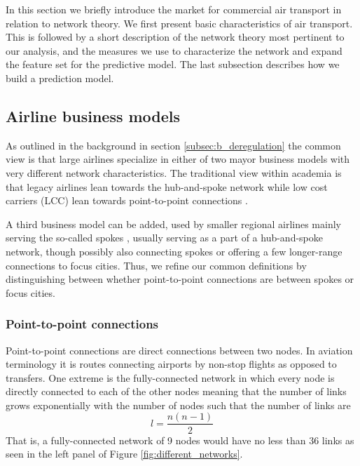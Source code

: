 \label{sec:theory}
In this section we briefly introduce the market for commercial air transport in relation to network theory. We first present basic characteristics of air transport. This is followed by a short description of the network theory most pertinent to our analysis, and the measures we use to characterize the network and expand the feature set for the predictive model. The last subsection describes how we build a prediction model. 



\subsection{Airline business models}
As outlined in the background in section \ref{subsec:b_deregulation} the common view is that large airlines specialize in either of two mayor business models with very different network characteristics. The traditional view within academia is that legacy airlines lean towards the hub-and-spoke network while low cost carriers (LCC) lean towards point-to-point connections \citep{daraban2012low,baker2013service,marti2015efficiency}.
\par
A third business model can be added, used by smaller regional airlines mainly serving the so-called spokes \citep{forbes2007role}, usually serving as a part of a hub-and-spoke network, though possibly also connecting spokes or offering a few longer-range connections to focus cities. Thus, we refine our common definitions by distinguishing between whether point-to-point connections are between spokes or focus cities.

\subsubsection{Point-to-point connections}
Point-to-point connections are direct connections between two nodes. In aviation terminology it is routes connecting airports by non-stop flights as opposed to transfers. One extreme is the fully-connected network in which every node is directly connected to each of the other nodes meaning that the number of links grows exponentially with the number of nodes such that the number of links are
\begin{equation*}
  l=\frac{n(n-1)}{2}
\end{equation*}
That is, a fully-connected network of 9 nodes would have no less than 36 links as seen in the left panel of Figure \ref{fig:different_networks}.

